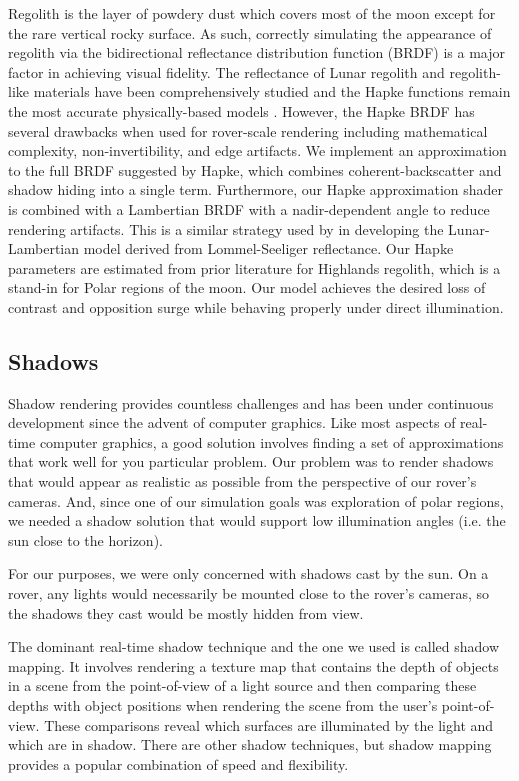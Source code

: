 \documentclass[twocolumn,letterpaper]{IEEEAerospaceCLS}  %
\begin{document}
Regolith is the layer of powdery dust which covers most of the moon except for the rare vertical rocky surface. As such, correctly simulating the appearance of regolith via the bidirectional reflectance distribution function (BRDF) is a major factor in achieving visual fidelity. The reflectance of Lunar regolith and regolith-like materials have been comprehensively studied and the Hapke functions remain the most accurate physically-based models \cite{hapke11}. However, the Hapke BRDF has several drawbacks when used for rover-scale rendering including mathematical complexity, non-invertibility, and edge artifacts\cite{Wong2012}. We implement an approximation to the full BRDF suggested by Hapke, which combines coherent-backscatter and shadow hiding into a single term. Furthermore, our Hapke approximation shader is combined with a Lambertian BRDF with a nadir-dependent angle to reduce rendering artifacts. This is a similar strategy used by \cite{McEwen1996} in developing the Lunar-Lambertian model derived from Lommel-Seeliger reflectance. Our Hapke parameters are estimated from prior literature for Highlands regolith, which is a stand-in for Polar regions of the moon. Our model achieves the desired loss of contrast and opposition surge while behaving properly under direct illumination.           

\subsection{Shadows}
Shadow rendering provides countless challenges and has been under continuous development since the advent of computer graphics. Like most aspects of real-time computer graphics, a good solution involves finding a set of approximations that work well for you particular problem. Our problem was to render shadows that would appear as realistic as possible from the perspective of our rover's cameras. And, since one of our simulation goals was exploration of polar regions, we needed a shadow solution that would support low illumination angles (i.e. the sun close to the horizon).

For our purposes, we were only concerned with shadows cast by the sun. On a rover, any lights would necessarily be mounted close to the rover's cameras, so the shadows they cast would be mostly hidden from view.

The dominant real-time shadow technique and the one we used is called shadow mapping. It involves rendering a texture map that contains the depth of objects in a scene from the point-of-view of a light source and then comparing these depths with object positions when rendering the scene from the user's point-of-view. These comparisons reveal which surfaces are illuminated by the light and which are in shadow. There are other shadow techniques, but shadow mapping provides a popular combination of speed and flexibility.
\end{document}

